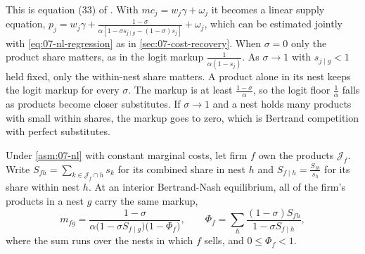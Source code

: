 This is equation (33) of \citet[p.~255]{Berry1994}. With $mc_j = w_j\gamma + \omega_j$ it becomes a linear supply
equation, $p_j = w_j\gamma + \frac{1-\sigma}{\alpha[1 - \sigma s_{j \mid g} - (1-\sigma)s_j]} + \omega_j$, which can be
estimated jointly with \eqref{eq:07-nl-regression} as in \cref{sec:07-cost-recovery}. When $\sigma = 0$ only the
product share matters, as in the logit markup $\frac{1}{\alpha(1-s_j)}$. As $\sigma \to 1$ with $s_{j \mid g} < 1$
held fixed, only the within-nest share matters. A product alone in its nest keeps the logit markup for every
$\sigma$. The markup is at least $\frac{1-\sigma}{\alpha}$, so the logit floor $\frac{1}{\alpha}$ falls as products become
closer substitutes. If $\sigma \to 1$ and a nest holds many products with small within shares, the markup goes to
zero, which is Bertrand competition with perfect substitutes.

\begin{proposition}\label{prop:07-nl-multi}
Under \cref{asm:07-nl} with constant marginal costs, let firm $f$ own the products $\mathcal{J}_f$. Write
$S_{fh} = \sum_{k \in \mathcal{J}_f \cap h}s_k$ for its combined share in nest $h$ and
$S_{f \mid h} = \frac{S_{fh}}{s_h}$ for its share within nest $h$. At an interior Bertrand-Nash equilibrium, all of
the firm's products in a nest $g$ carry the same markup,
\begin{equation}\label{eq:07-nl-multi}
m_{fg} = \frac{1-\sigma}{\alpha\big(1 - \sigma S_{f \mid g}\big)\big(1 - \Phi_f\big)}, \qquad
\Phi_f = \sum_{h} \frac{(1-\sigma)S_{fh}}{1 - \sigma S_{f \mid h}} ,
\end{equation}
where the sum runs over the nests in which $f$ sells, and $0 \le \Phi_f < 1$.
\end{proposition}

